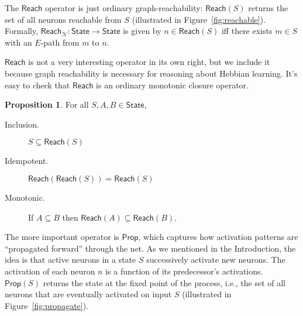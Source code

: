 \documentclass[letterpaper]{article}
\theoremstyle{definition}
\newtheorem{proposition}{Proposition}
\newcommand{\State}{\mathsf{State}}
\newcommand{\Net}{\mathcal{N}}
\newcommand{\Prop}{\mathsf{Prop}}
\newcommand{\Reach}{\mathsf{Reach}}
\begin{document}
The $\Reach$ operator is just ordinary graph-reachability: $\Reach(S)$ returns the set of all neurons reachable from $S$ (illustrated in Figure~\ref{fig:reachable}).  Formally, $\Reach_\Net : \State \to \State$ is given by $n \in \Reach(S)$ iff there exists $m \in S$ with an $E$-path from $m$ to $n$.

$\Reach$ is not a very interesting operator in its own right, but we include it because graph reachability is necessary for reasoning about Hebbian learning. It's easy to check that $\Reach$ is an ordinary monotonic closure operator.
\begin{proposition}\label{reach-properties}
    For all $S, A, B \in \State$,
    \begin{description}
        \item[Inclusion.] $S \subseteq \Reach(S)$
        \item[Idempotent.] $\Reach(\Reach(S)) = \Reach(S)$
        \item[Monotonic.] If $A \subseteq B$ then $\Reach(A) \subseteq \Reach(B)$.
    \end{description}
\end{proposition}

The more important operator is $\Prop$, which captures how activation patterns are ``propagated forward'' through the net.  As we mentioned in the Introduction, the idea is that active neurons in a state $S$ successively activate new neurons.  The activation of each neuron $n$ is a function of its predecessor's activations.  $\Prop(S)$ returns the state at the fixed point of the process, i.e., the set of all neurons that are eventually activated on input $S$ (illustrated in Figure~\ref{fig:propagate}).
\end{document}
